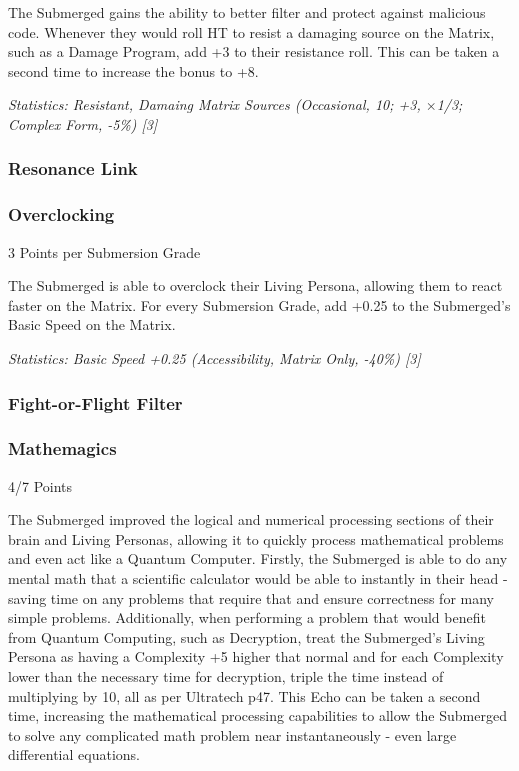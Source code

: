 \begin{multicols*}{3}
	The Submerged gains the ability to better filter and protect against malicious code. Whenever they would roll HT to resist a damaging source on the Matrix, such as a Damage Program, add +3 to their resistance roll. This can be taken a second time to increase the bonus to +8.
	
	\textit{\textcolor{OliveGreen}{Statistics: Resistant, Damaing Matrix Sources (Occasional, 10; +3, $\times$1/3; Complex Form, -5\%) [3] }}
	
	\subsubsection{Resonance Link}
	
	\subsubsection{Overclocking}
	\begin{flushright}
		3 Points per Submersion Grade
	\end{flushright}

	The Submerged is able to overclock their Living Persona, allowing them to react faster on the Matrix. For every Submersion Grade, add +0.25 to the Submerged's Basic Speed on the Matrix.	
	
	\textit{\textcolor{OliveGreen}{Statistics: Basic Speed +0.25 (Accessibility, Matrix Only, -40\%) [3] }}
	
	\subsubsection{Fight-or-Flight Filter}
	
	\subsubsection{Mathemagics}
	\begin{flushright}
		4/7 Points
	\end{flushright}
	
	The Submerged improved the logical and numerical processing sections of their brain and Living Personas, allowing it to quickly process mathematical problems and even act like a Quantum Computer. Firstly, the Submerged is able to do any mental math that a scientific calculator would be able to instantly in their head - saving time on any problems that require that and ensure correctness for many simple problems. Additionally, when performing a problem that would benefit from Quantum Computing, such as Decryption, treat the Submerged's Living Persona as having a Complexity +5 higher that normal and for each Complexity lower than the necessary time for decryption, triple the time instead of multiplying by 10, all as per Ultratech p47. This Echo can be taken a second time, increasing the mathematical processing capabilities to allow the Submerged to solve any complicated math problem near instantaneously - even large differential equations.
	

\end{multicols*}
